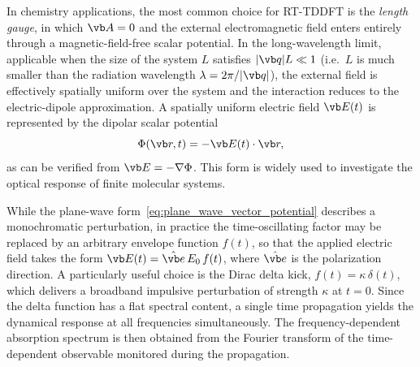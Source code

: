 
 
In chemistry applications, the most common choice for RT-TDDFT is the \emph{length gauge}, 
in which $\vb A = 0$ and the external electromagnetic field
enters entirely through a magnetic-field-free scalar potential.
In the long-wavelength limit, applicable when the size of the system $L$ satisfies $|\vb q| L \ll 1$ (i.e.\ $L$ is much
smaller than the radiation wavelength $\lambda = 2\pi/|\vb q|$), the external field is effectively
spatially uniform over the system and the interaction reduces to the electric-dipole approximation.
A spatially uniform electric field $\vb E(t)$ is represented by the dipolar scalar potential
\begin{equation}
  \Phi(\vb r,t) = -\vb E(t) \cdot \vb r,
  \label{eq:EM_dipolar}
\end{equation}
as can be verified from $\vb E = -\nabla\Phi$. This form is widely used to investigate the optical response of finite molecular systems.

While the plane-wave form~\eqref{eq:plane_wave_vector_potential} describes a monochromatic perturbation, in practice the
time-oscillating factor may be replaced by an arbitrary envelope function $f(t)$, so that the applied electric field
takes the form $\vb E(t) = \hat{\vb e}\, E_0\, f(t)$, where $\hat{\vb e}$ is the polarization direction.
A particularly useful choice is the Dirac delta kick, $f(t) = \kappa\,\delta(t)$, which delivers a broadband
impulsive perturbation of strength $\kappa$ at $t=0$.  Since the delta function has a flat spectral content,
a single time propagation yields the dynamical response at all frequencies simultaneously.
The frequency-dependent absorption spectrum is then obtained from the Fourier transform of the time-dependent observable
monitored during the propagation.

